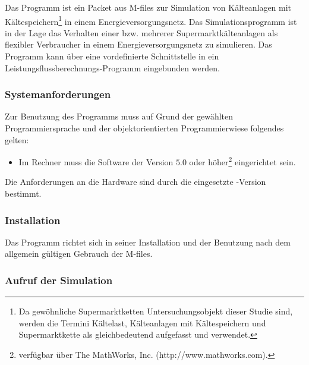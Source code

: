 Das Programm ist ein Packet aus \matlab M-files zur Simulation von Kälteanlagen
mit Kältespeichern\footnote{ Da gewöhnliche Supermarktketten Untersuchungsobjekt
dieser Studie sind, werden die Termini Kältelast, Kälteanlagen mit
Kältespeichern und Supermarktkette als gleichbedeutend aufgefasst und
verwendet.} in einem Energieversorgungsnetz. Das Simulationsprogramm ist in der
Lage das Verhalten einer bzw. mehrerer Supermarktkälteanlagen als flexibler
Verbraucher in einem Energieversorgungsnetz zu simulieren. Das Programm kann
über eine vordefinierte Schnittstelle in ein Leistungsflussberechnungs-Programm
eingebunden werden.

\subsubsection{Systemanforderungen}

Zur Benutzung des Programms muss auf Grund der gewählten Programmiersprache und
der objektorientierten Programmierwiese folgendes gelten:

\begin{itemize}
	\item Im Rechner muss die Software \matlab der Version $5.0$ oder
	höher\footnote{ \matlab verfügbar über The MathWorks, Inc.
	(http://www.mathworks.com).} eingerichtet sein.
\end{itemize}

Die Anforderungen an die Hardware sind durch die eingesetzte \matlab-Version
bestimmt.

\subsubsection{Installation}

Das Programm richtet sich in seiner Installation und der Benutzung nach dem
allgemein gültigen Gebrauch der \matlab M-files.

\subsubsection{Aufruf der Simulation}%

